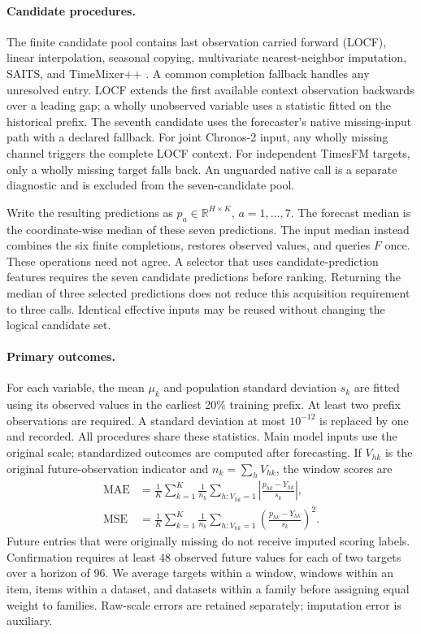 \documentclass{article}
\newcommand{\R}{\mathbb{R}}
\newcommand{\MAE}{\operatorname{MAE}}
\newcommand{\MSE}{\operatorname{MSE}}
\begin{document}
\paragraph{Candidate procedures.}
The finite candidate pool contains last observation carried forward (LOCF), linear interpolation, seasonal copying, multivariate nearest-neighbor imputation, SAITS, and TimeMixer++ \citep{du2023saits,wang2025timemixerpp}. A common completion fallback handles any unresolved entry. LOCF extends the first available context observation backwards over a leading gap; a wholly unobserved variable uses a statistic fitted on the historical prefix. The seventh candidate uses the forecaster's native missing-input path with a declared fallback. For joint Chronos-2 input, any wholly missing channel triggers the complete LOCF context. For independent TimesFM targets, only a wholly missing target falls back. An unguarded native call is a separate diagnostic and is excluded from the seven-candidate pool.

Write the resulting predictions as $p_a\in\R^{H\times K}$, $a=1,\ldots,7$. The forecast median is the coordinate-wise median of these seven predictions. The input median instead combines the six finite completions, restores observed values, and queries $F$ once. These operations need not agree. A selector that uses candidate-prediction features requires the seven candidate predictions before ranking. Returning the median of three selected predictions does not reduce this acquisition requirement to three calls. Identical effective inputs may be reused without changing the logical candidate set.

\paragraph{Primary outcomes.}
For each variable, the mean $\mu_k$ and population standard deviation $s_k$ are fitted using its observed values in the earliest 20\% training prefix. At least two prefix observations are required. A standard deviation at most $10^{-12}$ is replaced by one and recorded. All procedures share these statistics. Main model inputs use the original scale; standardized outcomes are computed after forecasting. If $V_{hk}$ is the original future-observation indicator and $n_k=\sum_hV_{hk}$, the window scores are
\begin{align}
 \MAE &= \frac1K\sum_{k=1}^K\frac1{n_k}
  \sum_{h:V_{hk}=1}\left|\frac{p_{hk}-Y_{hk}}{s_k}\right|,\\
 \MSE &= \frac1K\sum_{k=1}^K\frac1{n_k}
  \sum_{h:V_{hk}=1}\left(\frac{p_{hk}-Y_{hk}}{s_k}\right)^2.
 \label{eq:metrics}
\end{align}
Future entries that were originally missing do not receive imputed scoring labels. Confirmation requires at least 48 observed future values for each of two targets over a horizon of 96. We average targets within a window, windows within an item, items within a dataset, and datasets within a family before assigning equal weight to families. Raw-scale errors are retained separately; imputation error is auxiliary.
\end{document}
